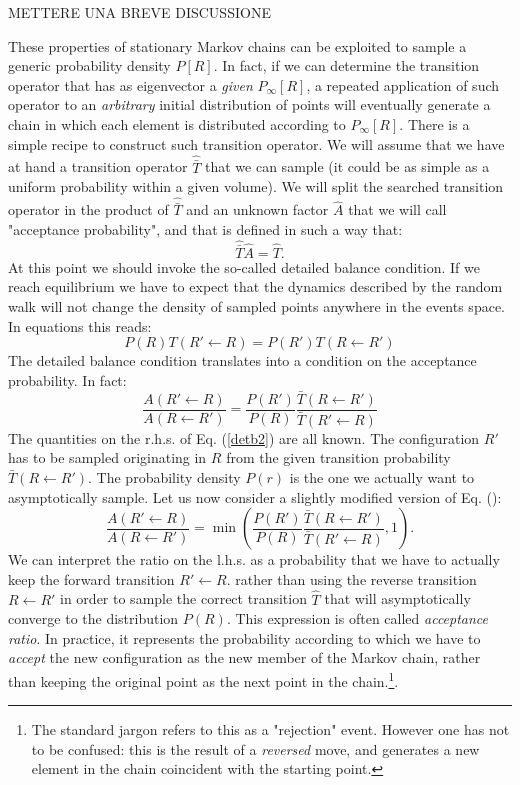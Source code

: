 {METTERE UNA BREVE DISCUSSIONE}

These properties of stationary Markov chains can be exploited to sample a generic probability density $P[R]$. In fact, if we can determine the transition operator that has as eigenvector a {\em given} $P_\infty[R]$, a repeated application of such operator to an {\em arbitrary} initial distribution of points will eventually generate a chain in which each element is distributed according to $P_\infty[R]$. There is a simple recipe to construct such transition operator. We will assume that we have at hand a transition operator $\hat{\bar{T}}$ that we can sample (it could be as simple as a uniform probability within a given volume). We will split the searched transition operator
in the product of $\hat{\bar{T}}$ and an unknown factor $\hat{A}$ that we will call "acceptance probability", and that is defined in such a way that:
\begin{equation}
\hat{\bar{T}}\hat{A}=\hat{T}.
\end{equation}
At this point we should invoke the so-called detailed balance condition. If we reach equilibrium we have to expect that the dynamics described by the random walk will not change the density of sampled points anywhere in
the events space. In equations this reads:
\begin{equation}
P(R)T(R'\leftarrow R)=P(R')T(R\leftarrow R')
\end{equation}
The detailed balance condition translates into a condition on the acceptance probability. In fact:
\begin{equation}
\frac{A(R'\leftarrow R)}{A(R\leftarrow R')}=\frac{P(R')}{P(R)}\frac{\bar{T}(R\leftarrow R')}{\bar{T}(R'\leftarrow R)}
\label{detb2}
\end{equation} 
The quantities on the r.h.s. of Eq. (\ref{detb2}) are all known. The configuration $R'$ has to be sampled 
originating in $R$ from the given transition probability $\bar{T}(R\leftarrow R')$. The probability density
$P(r)$ is the one we actually want to asymptotically sample. 
Let us now consider a slightly modified version of Eq. (\cite{detb2}):
\begin{equation}
\frac{A(R'\leftarrow R)}{A(R\leftarrow R')}=\min\left(\frac{P(R')}{P(R)}\frac{\bar{T}(R\leftarrow R')}{\bar{T}(R'\leftarrow R)},1\right).
\label{detb2}
\end{equation} 
We can interpret the ratio on the l.h.s. as a probability that we have to actually keep the forward transition $R'\leftarrow R$. rather than using the reverse transition $R \leftarrow R'$ in order to sample the correct transition $\hat{T}$ that will asymptotically converge to the distribution $P(R)$. 
This expression is often called {\it acceptance ratio}. In practice, it represents the probability according
to which we have to {\it accept} the new configuration as the new member of the Markov chain, rather than
keeping the original point as the next point in the chain.\footnote{The standard jargon refers to this as a "rejection" event. However one has not to be confused: this is the result of a {\it reversed} move, and generates a new element in the chain coincident with the starting point.}.

